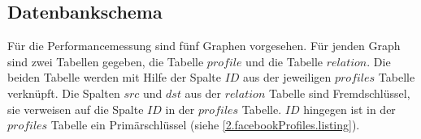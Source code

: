 \subsection{Datenbankschema}
Für die Performancemessung sind fünf Graphen vorgesehen.
Für jenden Graph sind zwei Tabellen gegeben, die Tabelle $profile$ und die Tabelle $relation$.
Die beiden Tabelle werden mit Hilfe der Spalte $ID$ aus der jeweiligen $profiles$ Tabelle verknüpft.
Die Spalten $src$ und $dst$ aus der $relation$ Tabelle sind Fremdschlüssel, sie verweisen auf die Spalte $ID$ in der $profiles$ Tabelle.
$ID$ hingegen ist in der $profiles$ Tabelle ein Primärschlüssel (siehe \ref{2.facebookProfiles.listing}).